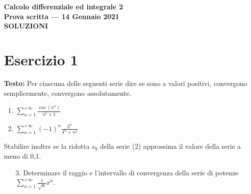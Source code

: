 \documentclass[12pt, a4paper]{article}
\begin{document}
\begin{center}
\Large\textbf{Calcolo differenziale ed integrale 2}\\
\large\textbf{Prova scritta --- 14 Gennaio 2021}\\
\large\textbf{SOLUZIONI }
\end{center}

\vspace{1cm}

\section*{Esercizio 1}

\textbf{Testo:} Per ciascuna delle seguenti serie dire se sono a valori positivi, convergono semplicemente, convergono assolutamente.
\begin{enumerate}
    \item $\displaystyle\sum_{n=1}^{+\infty} \frac{\cos(n^{4})}{n^{2}+1}$
    \item $\displaystyle\sum_{n=1}^{+\infty} (-1)^{n} \frac{3^{n}}{4^{n}+n^{2}}$
\end{enumerate}
Stabilire inoltre se la ridotta $s_{9}$ della serie (2) approssima il valore della serie a meno di 0,1.
\begin{enumerate}
    \item[3.] Determinare il raggio e l'intervallo di convergenza della serie di potenze $\displaystyle\sum_{n=1}^{+\infty} \frac{1}{\sqrt{n}}x^{n}$.
\end{enumerate}
\end{document}
